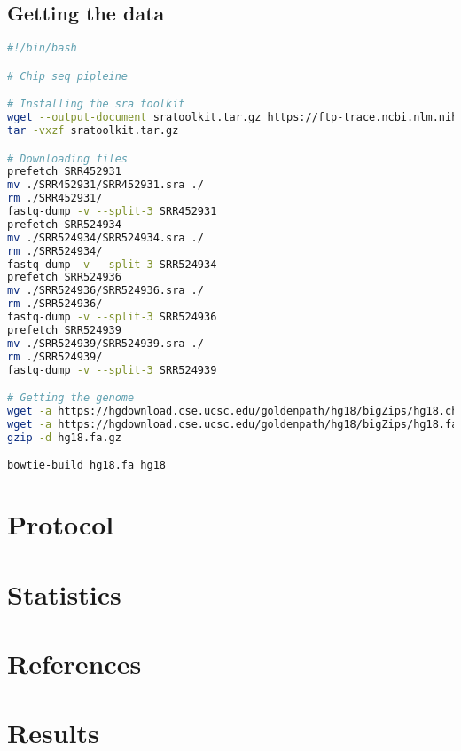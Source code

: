 \documentclass[12pt, a4paper]{article}
\begin{document}
\subsection{Getting the data}

\begin{lstlisting}[language=bash]
#!/bin/bash

# Chip seq pipleine

# Installing the sra toolkit
wget --output-document sratoolkit.tar.gz https://ftp-trace.ncbi.nlm.nih.gov/sra/sdk/current/sratoolkit.current-ubuntu64.tar.gz
tar -vxzf sratoolkit.tar.gz

# Downloading files
prefetch SRR452931
mv ./SRR452931/SRR452931.sra ./
rm ./SRR452931/
fastq-dump -v --split-3 SRR452931
prefetch SRR524934
mv ./SRR524934/SRR524934.sra ./
rm ./SRR524934/
fastq-dump -v --split-3 SRR524934
prefetch SRR524936
mv ./SRR524936/SRR524936.sra ./
rm ./SRR524936/
fastq-dump -v --split-3 SRR524936
prefetch SRR524939
mv ./SRR524939/SRR524939.sra ./
rm ./SRR524939/
fastq-dump -v --split-3 SRR524939

# Getting the genome
wget -a https://hgdownload.cse.ucsc.edu/goldenpath/hg18/bigZips/hg18.chrom.sizes
wget -a https://hgdownload.cse.ucsc.edu/goldenpath/hg18/bigZips/hg18.fa.gz
gzip -d hg18.fa.gz

bowtie-build hg18.fa hg18
\end{lstlisting}

\section{Protocol}

\section{Statistics}

\section{References}

\section{Results}
\end{document}
